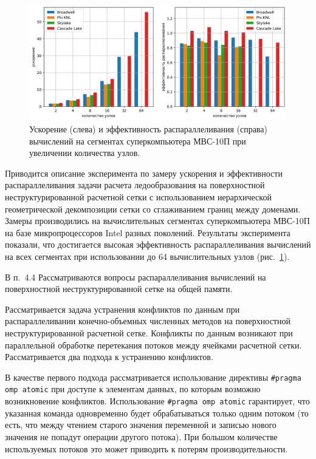 \documentclass[a4paper,14pt]{extarticle}                     %
\theoremstyle{plain}                                         %
\begin{document}
\begin{figure}[!ht]
\centering
\includegraphics[width=1.0\textwidth]{pics/text_2_scaling/2in1.png}
\singlespacing
\caption{Ускорение (слева) и эффективность распараллеливания (справа) вычислений на сегментах суперкомпьютера МВС-10П при увеличении количества узлов.}
\label{fig:text_2_scaling_speedup_eff}
\end{figure}

Приводится описание эксперимента по замеру ускорения и эффективности распараллеливания задачи расчета ледообразования на поверхностной неструктурированной расчетной сетки с использованием иерархической геометрической декомпозиции сетки со сглаживанием границ между доменами. Замеры производились на вычислительных сегментах суперкомпьютера МВС-10П на базе микропроцессоров Intel разных поколений.
Результаты эксперимента показали, что достигается высокая эффективность распараллеливания вычислений на всех сегментах при использовании до 64 вычислительных узлов (рис.~\ref{fig:text_2_scaling_speedup_eff}).


В п.~4.4 Рассматриваются вопросы распараллеливания вычислений на поверхностной неструктурированной сетке на общей памяти.

Рассматривается задача устранения конфликтов по данным при распараллеливании конечно-объемных численных методов на поверхностной неструктурированной расчетной сетке.
Конфликты по данным возникают при параллельной обработке перетекания потоков между ячейками расчетной сетки.
Рассматривается два подхода к устранению конфликтов.

В качестве первого подхода рассматривается использование директивы \texttt{\#pragma omp atomic} при доступе к элементам данных, по которым возможно возникновение конфликтов.
Использование \texttt{\#pragma omp atomic} гарантирует, что указанная команда одновременно будет обрабатываться только одним потоком (то есть, что между чтением старого значения переменной и записью нового значения не попадут операции другого потока).
При большом количестве используемых потоков это может приводить к потерям производительности.
\end{document}
